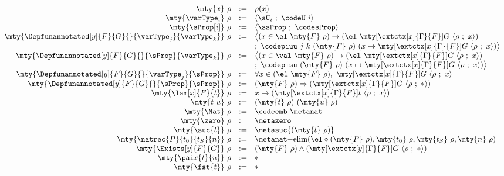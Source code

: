 \begin{figure}
  \begin{small}
\[
\begin{array}{rcl}
  \mty{x}\ \rho & := & \rho(x) \\
  \mty{\varType_i}\ \rho & := & \langle \sU_i\ ;\ \codeU\ i \rangle \\
  \mty{\sProp[i]}\ \rho & := & \langle \ssProp\ ;\ \codesProp \rangle\\
  \mty{\Depfunannotated[y]{F}{G}{}{\varType_j}{\varType_k}}\ \rho & := & \big\langle (x \in\el\ \mty{F}\ \rho)\to (\el\ \mty[{\extctx[x]{\Gamma}{F}}]{G}\ \langle \rho\ ;\ x\rangle)\\
& & ;\ \codepiuu\ j\ k\ (\mty{F}\ \rho)\ (x \mapsto \mty[{\extctx[x]{\Gamma}{F}}]{G}\ \langle \rho\ ;\ x\rangle) \big\rangle\\
  \mty{\Depfunannotated[y]{F}{G}{}{\sProp}{\varType_k}}\ \rho & := & \big\langle (x \in\val\ \mty{F}\ \rho)\to (\el\ \mty[{\extctx[x]{\Gamma}{F}}]{G}\ \langle \rho\ ;\ x\rangle)\\
& & ;\ \codepisu\ (\mty{F}\ \rho)\ (x \mapsto \mty[{\extctx[x]{\Gamma}{F}}]{G}\ \langle \rho\ ;\ x\rangle) \big\rangle\\
  \mty{\Depfunannotated[y]{F}{G}{}{\varType_j}{\sProp}}\ \rho & := & \forall x \in (\el\ \mty{F}\ \rho),\ \mty[{\extctx[x]{\Gamma}{F}}]{G}\ \langle \rho\ ;\ x\rangle\\
  \mty{\Depfunannotated[y]{F}{G}{}{\sProp}{\sProp}}\ \rho & := & (\mty{F}\ \rho) \Rightarrow (\mty[{\extctx[x]{\Gamma}{F}}]{G}\ \langle \rho\ ;\ *\rangle)\\
  \mty{\lam[x]{F}{t}}\ \rho & := & x \mapsto (\mty[{\extctx[x]{\Gamma}{F}}]{t}\ \langle \rho\ ;\ x\rangle)\\
  \mty{t\ u}\ \rho & := & (\mty{t}\ \rho)\ (\mty{u}\ \rho)\\
  \mty{\Nat}\ \rho & := & \codeemb\ \metanat \\
  \mty{\zero}\ \rho & := & \metazero \\
  \mty{\suc{t}}\ \rho & := & \metasuc{(\mty{t}\ \rho)} \\
  \mty{\natrec{P}{t_0}{t_S}{n}}\ \rho & := & \metanat\mathrm{-elim}(\el \circ (\mty{P}\ \rho), \mty{t_0}\ \rho, \mty{t_S}\ \rho, \mty{n}\ \rho)\\
  \mty{\Exists[y]{F}{G}}\ \rho & := & (\mty{F}\ \rho) \land (\mty[{\extctx[y]{\Gamma}{F}}]{G}\ \langle \rho\ ;\ * \rangle) \\
  \mty{\pair{t}{u}}\ \rho & := & * \\
  \mty{\fst{t}}\ \rho & := & * \\

\end{array}\]
\end{small}
\end{figure}

